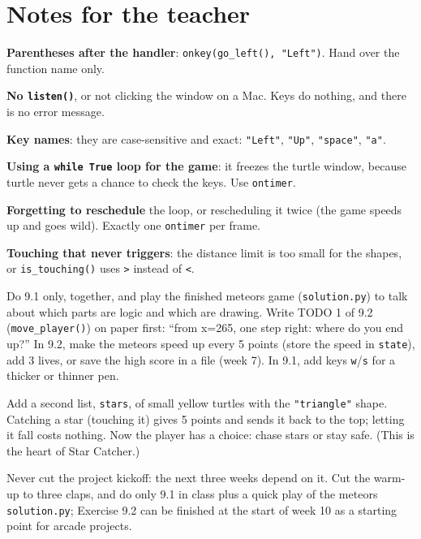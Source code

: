 \section{Notes for the teacher}
\begin{commonmistakes}
  \item \textbf{Parentheses after the handler}: \texttt{onkey(go\_left(), "Left")}. Hand over the function name only.
  \item \textbf{No \texttt{listen()}}, or not clicking the window on a Mac. Keys do nothing, and there is no error message.
  \item \textbf{Key names}: they are case-sensitive and exact: \texttt{"Left"}, \texttt{"Up"}, \texttt{"space"}, \texttt{"a"}.
  \item \textbf{Using a \texttt{while True} loop for the game}: it freezes the turtle window, because turtle never gets a chance to check the keys. Use \texttt{ontimer}.
  \item \textbf{Forgetting to reschedule} the loop, or rescheduling it twice (the game speeds up and goes wild). Exactly one \texttt{ontimer} per frame.
  \item \textbf{Touching that never triggers}: the distance limit is too small for the shapes, or \texttt{is\_touching()} uses \texttt{>} instead of \texttt{<}.
\end{commonmistakes}

\begin{differentiation}
\supportpath Do 9.1 only, together, and play the finished meteors game (\texttt{solution.py}) to talk about which parts are logic and which are drawing.
Write TODO 1 of 9.2 (\texttt{move\_player()}) on paper first: \enquote{from x=265, one step right: where do you end up?}
\extensionpath In 9.2, make the meteors speed up every 5 points (store the speed in \texttt{state}), add 3 lives, or save the high score in a file (week 7).
In 9.1, add keys \texttt{w}/\texttt{s} for a thicker or thinner pen.
\end{differentiation}

\begin{stretchchallenge}
Add a second list, \texttt{stars}, of small yellow turtles with the \texttt{"triangle"} shape. Catching a star (touching it) gives 5 points and sends it back to
the top; letting it fall costs nothing. Now the player has a choice: chase stars or stay safe. (This is the heart of Star Catcher.)
\end{stretchchallenge}

\begin{teachernote}
Never cut the project kickoff: the next three weeks depend on it. Cut the warm-up to three claps, and do only 9.1 in class plus a quick play of the
meteors \texttt{solution.py}; Exercise 9.2 can be finished at the start of week 10 as a starting point for arcade projects.
\end{teachernote}
